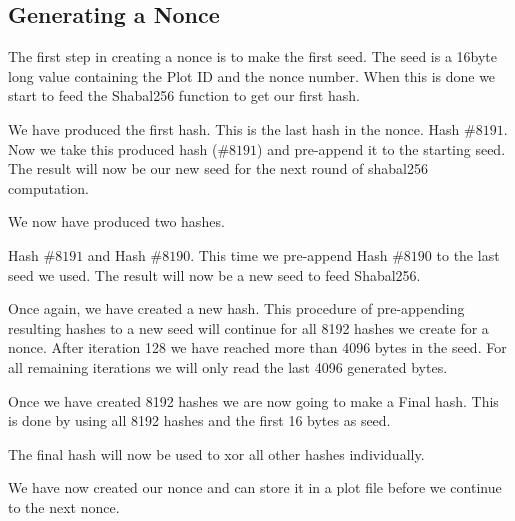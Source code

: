 \subsection{Generating a Nonce}
\begin{flushleft}
    The first step in creating a nonce is to make the first seed. The seed is a 16byte long value containing the Plot ID and the nonce number. When this is done we start to feed the Shabal256 function to get our first hash.
\end{flushleft}
\begin{flushleft}
    We have produced the first hash. This is the last hash in the nonce. Hash $\#8191$. Now we take this produced hash ($\#8191$) and pre-append it to the starting seed. The result will now be our new seed for the next round of shabal256 computation.
\end{flushleft}
\begin{flushleft}
    We now have produced two hashes.
\end{flushleft}
\begin{flushleft}
Hash $\#8191$ and Hash $\#8190$. This time we pre-append Hash $\#8190$ to the last seed we used. The result will now be a new seed to feed Shabal256.
\end{flushleft}
\begin{flushleft}
    Once again, we have created a new hash. This procedure of pre-appending resulting hashes to a new seed will continue for all 8192 hashes we create for a nonce. After iteration 128 we have reached more than 4096 bytes in the seed. For all remaining iterations we will only read the last 4096 generated bytes.
\end{flushleft}
\begin{flushleft}
    Once we have created 8192 hashes we are now going to make a Final hash. This is done by using all 8192 hashes and the first 16 bytes as seed.
\end{flushleft}
\begin{flushleft}
    The final hash will now be used to xor all other hashes individually.
\end{flushleft}
\begin{flushleft}
    We have now created our nonce and can store it in a plot file before we continue to the next nonce.
\end{flushleft}
